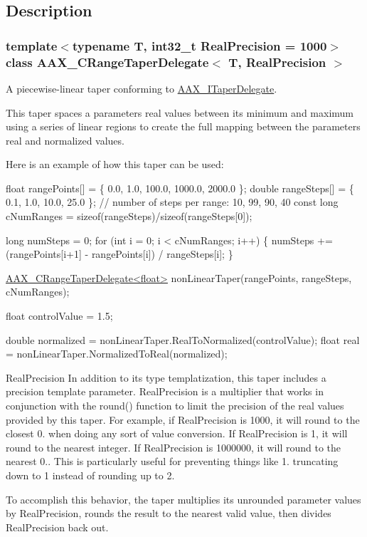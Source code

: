 \subsection{Description}
\subsubsection*{template$<$typename T, int32\+\_\+t Real\+Precision = 1000$>$class A\+A\+X\+\_\+\+C\+Range\+Taper\+Delegate$<$ T, Real\+Precision $>$}

A piecewise-\/linear taper conforming to \hyperlink{a00114}{A\+A\+X\+\_\+\+I\+Taper\+Delegate}. 

This taper spaces a parameter\textquotesingle{}s real values between its minimum and maximum using a series of linear regions to create the full mapping between the parameter\textquotesingle{}s real and normalized values.

Here is an example of how this taper can be used\+:


\begin{DoxyCode}
\textcolor{keywordtype}{float} rangePoints[] = \{ 0.0, 1.0, 100.0, 1000.0, 2000.0 \};
\textcolor{keywordtype}{double} rangeSteps[] = \{ 0.1, 1.0, 10.0, 25.0 \}; \textcolor{comment}{// number of steps per range: 10, 99, 90, 40 }
\textcolor{keyword}{const} \textcolor{keywordtype}{long} cNumRanges = \textcolor{keyword}{sizeof}(rangeSteps)/\textcolor{keyword}{sizeof}(rangeSteps[0]);

\textcolor{keywordtype}{long} numSteps = 0;
\textcolor{keywordflow}{for} (\textcolor{keywordtype}{int} i = 0; i < cNumRanges; i++)
\{
    numSteps += (rangePoints[i+1] - rangePoints[i]) / rangeSteps[i];
\}

\hyperlink{a00038}{AAX\_CRangeTaperDelegate<float>} nonLinearTaper(rangePoints, rangeSteps, 
      cNumRanges);

\textcolor{keywordtype}{float} controlValue = 1.5;

\textcolor{keywordtype}{double} normalized = nonLinearTaper.RealToNormalized(controlValue);
\textcolor{keywordtype}{float} real = nonLinearTaper.NormalizedToReal(normalized);
\end{DoxyCode}


\begin{DoxyParagraph}{Real\+Precision}
In addition to its type templatization, this taper includes a precision template parameter. Real\+Precision is a multiplier that works in conjunction with the round() function to limit the precision of the real values provided by this taper. For example, if Real\+Precision is 1000, it will round to the closest 0. when doing any sort of value conversion. If Real\+Precision is 1, it will round to the nearest integer. If Real\+Precision is 1000000, it will round to the nearest 0.. This is particularly useful for preventing things like 1. truncating down to 1 instead of rounding up to 2.
\end{DoxyParagraph}
To accomplish this behavior, the taper multiplies its unrounded parameter values by Real\+Precision, rounds the result to the nearest valid value, then divides Real\+Precision back out.

